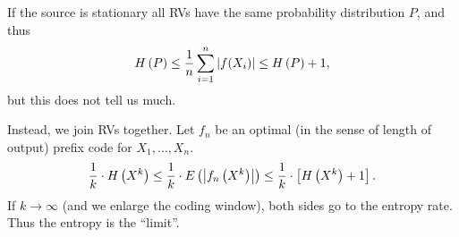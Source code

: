 If the source is stationary all \acp{RV} have the same probability distribution $P$, and thus
\begin{equation*}
	H\left({P}\right) \le \frac{1}{n} \sum_{i = 1}^n \left|{f(X_i)}\right| \le H\left({P}\right) + 1,
\end{equation*}
but this does not tell us much.

Instead, we join \acp{RV} together.
Let $f_n$ be an optimal (in the sense of length of output) prefix code for $X_1, \dots, X_n$.
\begin{equation*}
	\frac{1}{k} \cdot H\left({X^k}\right)
	\le
	\frac{1}{k} \cdot E \left({\left|{f_n \left( X^k \right)}\right|}\right)
	\le
	\frac{1}{k} \cdot \left[ H\left({X^k}\right) + 1 \right].
\end{equation*}
If $k \to \infty$ (and we enlarge the coding window), both sides go to the entropy rate.
Thus the entropy is the ``limit''.
